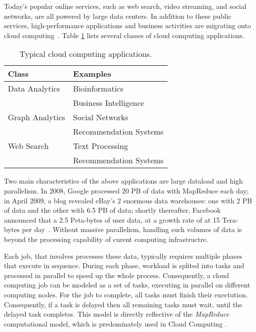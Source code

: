 
Today's popular online services, such as web search, video streaming,
and social networks, are all powered by large data centers. In
addition to these public services, high-performance applications and
business activities are migrating onto cloud computing~\cite{Ferdman:2012:CCS:2150976.2150982,mrbs}. Table \ref{tbl:apps}
lists several classes of cloud computing applications. 

\begin{table}[!h]
	\caption{Typical cloud computing applications.}
	\centering
		\begin{tabularx}{\columnwidth}{|l|X|}
			\hline
			Class                          & Examples                         \\
			\hline
			Data Analytics   & Bioinformatics\\ 
			& Business Intelligence\\
			\hline
			Graph Analytics  & Social Networks\\ 
			& Recommendation Systems\\
			\hline
			Web Search       & Text Processing\\
			& Recommendation Systems\\
			\hline
			\end{tabularx}
	\label{tbl:apps}
\end{table}

Two main characteristics of the above applications are large dataload
and high parallelism. In 2008, Google processed 20 PB of data with
MapReduce each day; in April 2009, a blog revealed eBay's 2 enormous
data warehouses: one with 2 PB of data and the other with 6.5 PB of
data; shortly thereafter, Facebook announced that a 2.5
Peta-bytes of user data, at a growth rate of at 15 Tera-bytes per day~\cite{lin2010data}. 
Without massive parallelism, handling such volumes of data is beyond the processing capability of curent computing infrastructre. 

Each job, that involves processes these data, typically requires multiple
phases that execute in sequence. During each phase, workload is
splited into tasks and processed in parallel to speed up the whole
process.  Consequently, a cloud computing job can be modeled as 
a set of tasks, executing in parallel on different computing nodes. For the job to complete, all tasks must finish their exectution. 
Consequently, if a task is delayed then all remaining tasks must wait, until the delayed task completes. 
This model is directly reflective of the \emph{MapReduce}
computational model, which is predominately used in Cloud
Computing \cite{mrbs}.  

